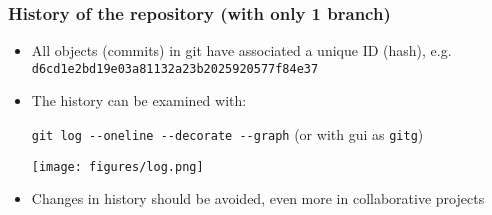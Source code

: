\documentclass[xcolor=dvipsnames,10pt]{beamer}
\begin{document}
\begin{frame}
 \frametitle{History of the repository (with only 1 branch)}
 
 \begin{itemize}
  \item All objects (commits) in git have associated a unique ID (hash), e.g. \texttt{d6cd1e2bd19e03a81132a23b2025920577f84e37}
  \vspace*{0.2cm}
  
  \item The history can be examined with:

  \texttt{git log -{}-oneline -{}-decorate -{}-graph} (or with gui as \texttt{gitg}) 
  \begin{center}
   \texttt{[image: figures/log.png]}
  \end{center}
    \vspace*{0.2cm}

   \item Changes in history should be avoided, even more in collaborative projects
  
 \end{itemize}

 
\end{frame}
\end{document}
